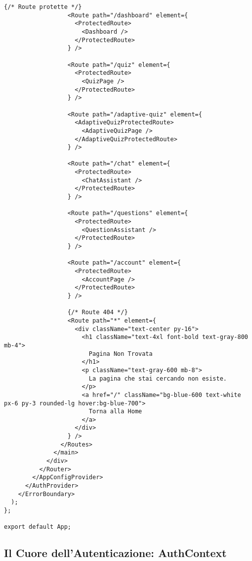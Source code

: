 \documentclass[a4paper, 14pt, oneside]{extbook}
\begin{document}
\begin{lstlisting}[style=javascriptstyle, caption=Componente App React - Orchestrazione Intelligente, label=lst:app-component]
                  {/* Route protette */}
                  <Route path="/dashboard" element={
                    <ProtectedRoute>
                      <Dashboard />
                    </ProtectedRoute>
                  } />
                  
                  <Route path="/quiz" element={
                    <ProtectedRoute>
                      <QuizPage />
                    </ProtectedRoute>
                  } />
                  
                  <Route path="/adaptive-quiz" element={
                    <AdaptiveQuizProtectedRoute>
                      <AdaptiveQuizPage />
                    </AdaptiveQuizProtectedRoute>
                  } />
                  
                  <Route path="/chat" element={
                    <ProtectedRoute>
                      <ChatAssistant />
                    </ProtectedRoute>
                  } />
                  
                  <Route path="/questions" element={
                    <ProtectedRoute>
                      <QuestionAssistant />
                    </ProtectedRoute>
                  } />
                  
                  <Route path="/account" element={
                    <ProtectedRoute>
                      <AccountPage />
                    </ProtectedRoute>
                  } />
                  
                  {/* Route 404 */}
                  <Route path="*" element={
                    <div className="text-center py-16">
                      <h1 className="text-4xl font-bold text-gray-800 mb-4">
                        Pagina Non Trovata
                      </h1>
                      <p className="text-gray-600 mb-8">
                        La pagina che stai cercando non esiste.
                      </p>
                      <a href="/" className="bg-blue-600 text-white px-6 py-3 rounded-lg hover:bg-blue-700">
                        Torna alla Home
                      </a>
                    </div>
                  } />
                </Routes>
              </main>
            </div>
          </Router>
        </AppConfigProvider>
      </AuthProvider>
    </ErrorBoundary>
  );
};

export default App;
\end{lstlisting}

\subsection{Il Cuore dell'Autenticazione: AuthContext}
\end{document}
